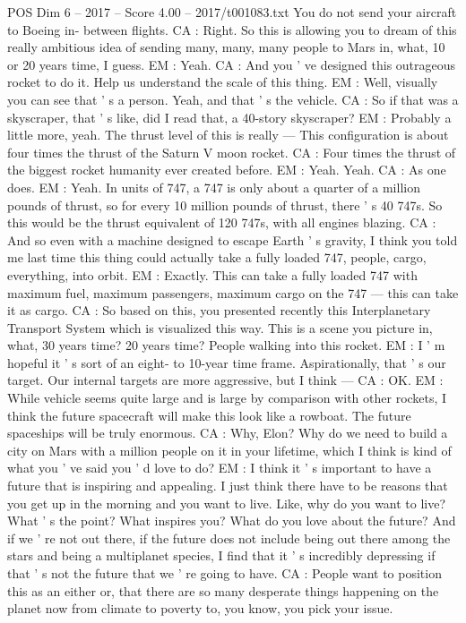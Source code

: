\begin{textsample}{POS Dim 6 – 2017 – Score 4.00 – 2017/t001083.txt}
You do not send your aircraft to Boeing in- between flights.
CA : Right.
So this is allowing you to dream of this really ambitious idea of sending many, many, many people to Mars in, what, 10 or 20 years time, I guess.
EM : Yeah.
CA : And you ' ve designed this outrageous rocket to do it.
Help us understand the scale of this thing.
EM : Well, visually you can see that ' s a person.
Yeah, and that ' s the vehicle.
CA : So if that was a skyscraper, that ' s like, did I read that, a 40-story skyscraper?
EM : Probably a little more, yeah.
The thrust level of this is really — This configuration is about four times the thrust of the Saturn V moon rocket.
CA : Four times the thrust of the biggest rocket humanity ever created before.
EM : Yeah.
Yeah.
CA : As one does.
EM : Yeah.
In units of 747, a 747 is only about a quarter of a million pounds of thrust, so for every 10 million pounds of thrust, there ' s 40 747s.
So this would be the thrust equivalent of 120 747s, with all engines blazing.
CA : And so even with a machine designed to escape Earth ' s gravity, I think you told me last time this thing could actually take a fully loaded 747, people, cargo, everything, into orbit.
EM : Exactly.
This can take a fully loaded 747 with maximum fuel, maximum passengers, maximum cargo on the 747 — this can take it as cargo.
CA : So based on this, you presented recently this Interplanetary Transport System which is visualized this way.
This is a scene you picture in, what, 30 years time? 20 years time?
People walking into this rocket.
EM : I ' m hopeful it ' s sort of an eight- to 10-year time frame.
Aspirationally, that ' s our target.
Our internal targets are more aggressive, but I think — CA : OK.
EM : While vehicle seems quite large and is large by comparison with other rockets, I think the future spacecraft will make this look like a rowboat.
The future spaceships will be truly enormous.
CA : Why, Elon?
Why do we need to build a city on Mars with a million people on it in your lifetime, which I think is kind of what you ' ve said you ' d love to do?
EM : I think it ' s important to have a future that is inspiring and appealing.
I just think there have to be reasons that you get up in the morning and you want to live.
Like, why do you want to live?
What ' s the point?
What inspires you?
What do you love about the future?
And if we ' re not out there, if the future does not include being out there among the stars and being a multiplanet species, I find that it ' s incredibly depressing if that ' s not the future that we ' re going to have.
CA : People want to position this as an either or, that there are so many desperate things happening on the planet now from climate to poverty to, you know, you pick your issue.

\end{textsample}
